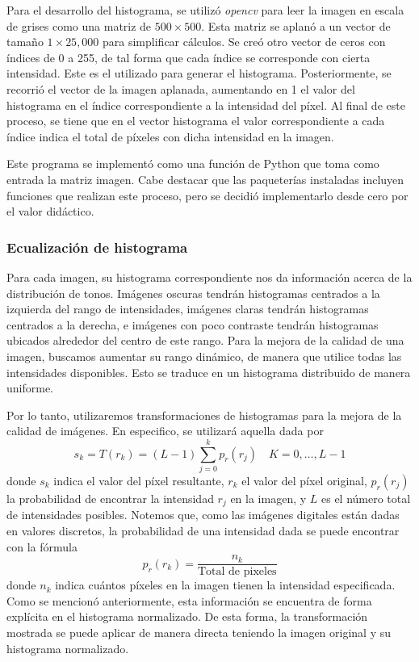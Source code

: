 \documentclass[12pt]{article}
\begin{document}
Para el desarrollo del histograma, se utilizó \textit{opencv} para leer la imagen en escala de grises como una matriz de $500\times500$. Esta matriz se aplanó a un vector de tamaño $1\times25,000$ para simplificar cálculos. Se creó otro vector de ceros con índices de 0 a 255, de tal forma que cada índice se corresponde con cierta intensidad. Este es el utilizado para generar el histograma. Posteriormente, se recorrió el vector de la imagen aplanada, aumentando en 1 el valor del histograma en el índice correspondiente a la intensidad del píxel. Al final de este proceso, se tiene que en el vector histograma el valor correspondiente a cada índice indica el total de píxeles con dicha intensidad en la imagen.

Este programa se implementó como una función de Python que toma como entrada la matriz imagen. Cabe destacar que las paqueterías instaladas incluyen funciones que realizan este proceso, pero se decidió implementarlo desde cero por el valor didáctico. 
\subsubsection{Ecualización de histograma}
Para cada imagen, su histograma correspondiente nos da información acerca de la distribución de tonos. Imágenes oscuras tendrán histogramas centrados a la izquierda del rango de intensidades, imágenes claras tendrán histogramas centrados a la derecha, e imágenes con poco contraste tendrán histogramas ubicados alrededor del centro de este rango. Para la mejora de la calidad de una imagen, buscamos aumentar su rango dinámico, de manera que utilice todas las intensidades disponibles. Esto se traduce en un histograma distribuido de manera uniforme.

Por lo tanto, utilizaremos transformaciones de histogramas para la mejora de la calidad de imágenes. En especifico, se utilizará aquella dada por  
\cite{gonzalezDigitalImageProcessing2017}
$$
s_k = T(r_k) = (L-1) \sum_{j=0}^k p_r(r_j) \quad K = 0, \dots, L-1 
$$
donde $s_k$ indica el valor del píxel resultante, $r_k$ el valor del píxel original, $p_r(r_j)$ la probabilidad de encontrar la intensidad $r_j$ en la imagen, y $L$ es el número total de intensidades posibles. Notemos que, como las imágenes digitales están dadas en valores discretos, la probabilidad de una intensidad dada se puede encontrar con la fórmula
$$
p_r(r_k) = \dfrac{n_k}{\text{Total de pixeles}}
$$
donde $n_k$ indica cuántos píxeles en la imagen tienen la intensidad especificada. Como se mencionó anteriormente, esta información se encuentra de forma explícita en el histograma normalizado. De esta forma, la transformación mostrada se puede aplicar de manera directa teniendo la imagen original y su histograma normalizado.
\end{document}
